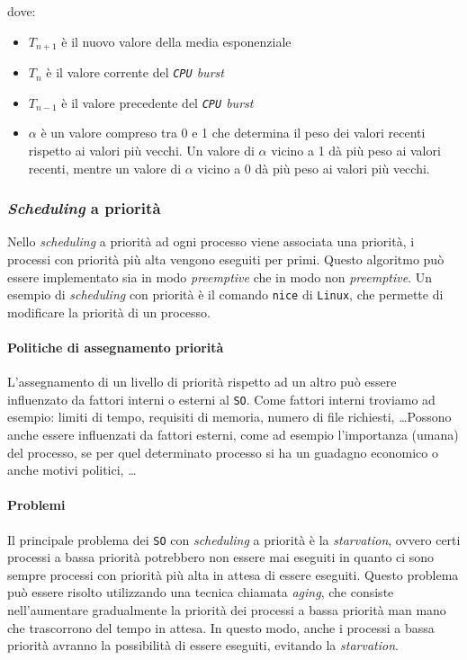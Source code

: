             dove:
            \begin{itemize}
                \item $T_{n+1}$ è il nuovo valore della media esponenziale
                \item $T_n$ è il valore corrente del \textit{\texttt{CPU} burst}
                \item $T_{n-1}$ è il valore precedente del \textit{\texttt{CPU} burst}
                \item $\alpha$ è un valore compreso tra 0 e 1 che determina il peso dei valori recenti rispetto ai valori più vecchi. Un valore di $\alpha$ vicino a 1 dà più peso ai valori recenti, mentre un valore di $\alpha$ vicino a 0 dà più peso ai valori più vecchi.
            \end{itemize}
        \subsubsection{\textit{Scheduling} a priorità}
            Nello \textit{scheduling} a priorità ad ogni processo viene associata una priorità, i processi con priorità più alta vengono eseguiti per primi. Questo algoritmo può essere implementato sia in modo \textit{preemptive} che in modo non \textit{preemptive}. Un esempio di \textit{scheduling} con priorità è il comando \texttt{nice} di \texttt{Linux}, che permette di modificare la priorità di un processo.
            \paragraph{Politiche di assegnamento priorità} L'assegnamento di un livello di priorità rispetto ad un altro può essere influenzato da fattori interni o esterni al \texttt{SO}. Come fattori interni troviamo ad esempio: limiti di tempo, requisiti di memoria, numero di file richiesti, \dots\newline Possono anche essere influenzati da fattori esterni, come ad esempio l'importanza (umana) del processo, se per quel determinato processo si ha un guadagno economico o anche motivi politici, \dots
            \paragraph{Problemi} Il principale problema dei \texttt{SO} con \textit{scheduling} a priorità è la \textit{starvation}, ovvero certi processi a bassa priorità potrebbero non essere mai eseguiti in quanto ci sono sempre processi con priorità più alta in attesa di essere eseguiti. Questo problema può essere risolto utilizzando una tecnica chiamata \textit{aging}, che consiste nell'aumentare gradualmente la priorità dei processi a bassa priorità man mano che trascorrono del tempo in attesa. In questo modo, anche i processi a bassa priorità avranno la possibilità di essere eseguiti, evitando la \textit{starvation}.
